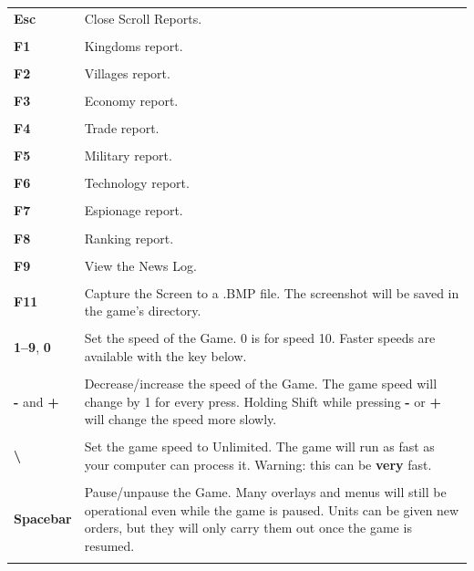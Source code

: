 \begin{longtable}{p{1in} p{3in}}
    \textbf{Esc} & Close Scroll Reports. \\ \\
    \textbf{F1} & Kingdoms report. \\ \\
    \textbf{F2} & Villages report. \\ \\
    \textbf{F3} & Economy report. \\ \\
    \textbf{F4} & Trade report. \\\\
    \textbf{F5} & Military report. \\ \\ 
    \textbf{F6} & Technology report. \\ \\
    \textbf{F7} & Espionage report. \\ \\
    \textbf{F8} & Ranking report. \\ \\
    \textbf{F9} & View the News Log. \\ \\
    \textbf{F11} & Capture the Screen to a .BMP file. The screenshot will be saved in the game’s directory. \\ \\
%
    \textbf{1–9}, \textbf{0} & Set the speed of the Game.  0 is for speed 10.
    Faster speeds are available with the key below.\\ \\

    \textbf{-} and \textbf{+} & Decrease/increase the speed of the Game.  The
    game speed will change by 1 for every press.  Holding Shift while pressing
    \textbf{-} or \textbf{+} will change the speed more slowly.\\ \\

    \textbf{\textbackslash} & Set the game speed to Unlimited.  The game will
    run as fast as your computer can process it.  Warning: this can be
    \textbf{very} fast.\\ \\

    \textbf{Spacebar} & Pause/unpause the Game.  Many overlays and menus will
    still be operational even while the game is paused.  Units can be given new
    orders, but they will only carry them out once the game is resumed.\\ \\


\end{longtable}
